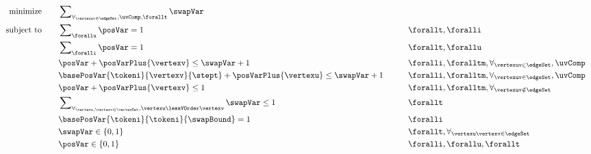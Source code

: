 \begin{align}
\text{minimize}   \qquad & \sum\nolimits_{\forall_{\vertexuv \in \edgeSet},\uvComp,\forallt} \swapVar & \label{equ:model-ts:m}\\
\text{subject to} \qquad & \sum\nolimits_{\forallu} \posVar = 1 & &\forallt, \foralli \label{equ:model-ts:1}\\
                  & \sum\nolimits_{\foralli} \posVar = 1 & &\forallt, \forallu \label{equ:model-ts:2}\\
                  & \posVar + \posVarPlus{\vertexv} \leq \swapVar + 1 \qquad & &\foralli, \foralltm, \forall_{\vertexuv \in \edgeSet}, \uvComp \label{equ:model-ts:3} \\
                  & \basePosVar{\tokeni}{\vertexv}{\stept} + \posVarPlus{\vertexu} \leq \swapVar + 1 \qquad & &\foralli, \foralltm, \forall_{\vertexuv \in \edgeSet}, \uvComp \label{equ:model-ts:4}\\
                  & \posVar + \posVarPlus{\vertexv} \leq 1 & &\foralli, \foralltm, \forall_{\vertexuv \notin \edgeSet} \label{equ:model-ts:5} \\
                  & \sum\nolimits_{\forall_{\vertexu,\vertexv \in \vertexSet}, \vertexu\lessVOrder\vertexv} \swapVar \leq 1 & &\forallt \label{equ:model-ts:6} \\
                  & \basePosVar{\tokeni}{\tokeni}{\swapBound} = 1 & &\foralli \label{equ:model-ts:7}\\
                  & \swapVar \in \{0,1\} & &\forallt, \forall_{\vertexu\vertexv \in \edgeSet} \label{equ:model-ts:8}\\
                  & \posVar  \in \{0,1\} & &\foralli, \forallu, \forallt \label{equ:model-ts:9}
\end{align}
